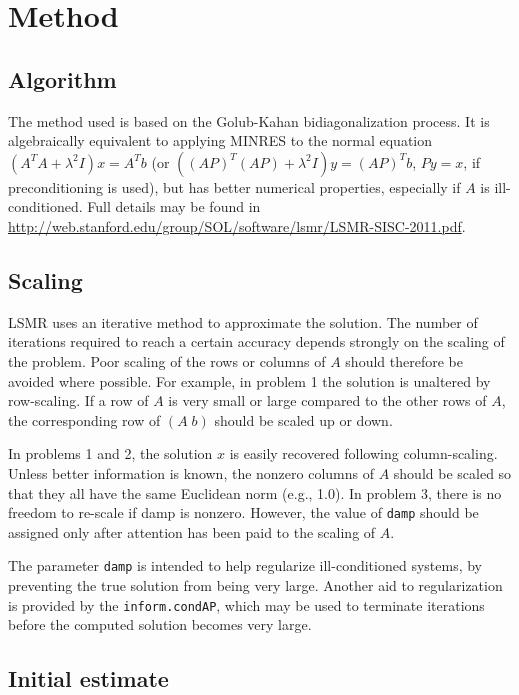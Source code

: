 \section{Method} \label{method}

\subsection{Algorithm}
The method used is based on the Golub-Kahan bidiagonalization process. 
It is algebraically equivalent to applying MINRES to the normal 
equation $(A^TA+\lambda^2I)x=A^Tb$ (or $((AP)^T(AP)+\lambda^2I)y=(AP)^Tb$,
$Py = x$,
if preconditioning is used), but has better numerical properties, 
especially if $A$ is ill-conditioned. 
Full details may be found in
{\url{
http://web.stanford.edu/group/SOL/software/lsmr/LSMR-SISC-2011.pdf}}.

\subsection{Scaling}
     LSMR uses an iterative method to approximate the solution.
     The number of iterations required to reach a certain accuracy
     depends strongly on the scaling of the problem.  Poor scaling of
     the rows or columns of $A $ should therefore be avoided where
     possible. For example, in problem 1 the solution is unaltered by
     row-scaling.  If a row of $A$ is very small or large compared to
     the other rows of $A$, the corresponding row of $ ( A\;  b )$ should be
     scaled up or down.
    
     In problems 1 and 2, the solution $x$ is easily recovered
     following column-scaling.  Unless better information is known,
     the nonzero columns of $A$ should be scaled so that they all have
     the same Euclidean norm (e.g., 1.0).
     In problem 3, there is no freedom to re-scale if damp is
     nonzero.  However, the value of {\tt damp} should be assigned only
     after attention has been paid to the scaling of $A$.
    
     The parameter {\tt damp} is intended to help regularize
     ill-conditioned systems, by preventing the true solution from
     being very large.  Another aid to regularization is provided by
     the {\tt inform.condAP}, which may be used to terminate iterations
     before the computed solution becomes very large.

\subsection{Initial estimate}
    
